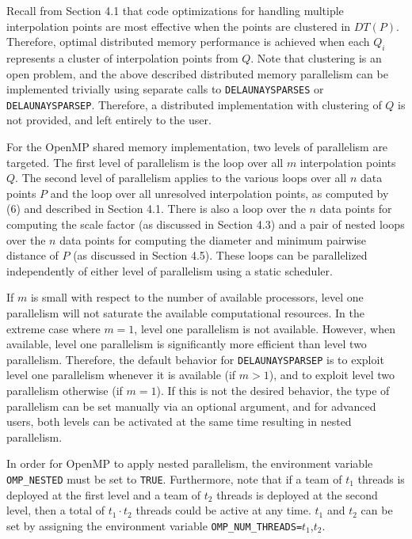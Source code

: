 {\enspace
Recall from Section 4.1 that code optimizations for handling multiple
interpolation points are most effective when the points are clustered
in $DT(P)$. Therefore, optimal distributed memory performance is achieved
when each $Q_i$ represents a cluster of interpolation points from $Q$.
Note that clustering is an open problem, and the above described
distributed memory parallelism can be implemented trivially using separate
calls to {\tt DELAUNAYSPARSES} or {\tt DELAUNAYSPARSEP}. Therefore, a
distributed implementation with clustering of $Q$ is not provided, and
left entirely to the user.
\medskip

For the OpenMP shared memory implementation, two levels of parallelism
are targeted. The first level of parallelism is the loop over all $m$
interpolation points $Q$. The second level of parallelism applies to
the various loops over all $n$ data points $P$ and the loop over all
unresolved interpolation points, as computed by (6) and described in
Section 4.1.
There is also a loop over the $n$ data points for computing the scale
factor (as discussed in Section 4.3) and a pair of nested loops over
the $n$ data points for computing the diameter and minimum pairwise
distance of $P$ (as discussed in Section 4.5).
These loops can be parallelized independently of either level of
parallelism using a static scheduler.

If $m$ is small with respect to the number of available processors,
level one parallelism will not saturate the available computational
resources. In the extreme case where $m=1$, level one parallelism is
not available. However, when available, level one parallelism is
significantly more efficient than level two parallelism. Therefore, the
default behavior for {\tt DELAUNAYSPARSEP} is to exploit level one
parallelism whenever it is available (if $m > 1$), and to exploit level
two parallelism otherwise (if $m = 1$). If this is not the desired
behavior, the type of parallelism can be set manually via an optional
argument, and for advanced
users, both levels can be activated at the same time resulting in
nested parallelism.

\enspace
In order for OpenMP to apply nested parallelism, the environment variable
{\tt OMP\_NESTED} must be set to {\tt TRUE}. Furthermore, note that if
a team of $t_1$ threads is deployed at the first level and a team of $t_2$
threads is deployed at the second level, then a total of $t_1 \cdot t_2$
threads could be active at any time. $t_1$ and $t_2$ can be set by
assigning the environment variable {\tt OMP\_NUM\_THREADS=}$t_1$,$t_2$.
\medskip

}
